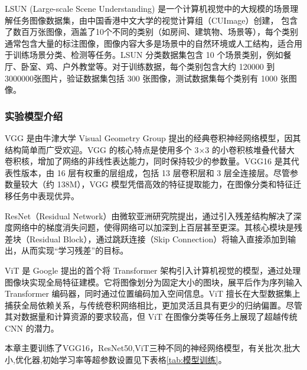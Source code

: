 LSUN (Large-scale Scene Understanding) 是一个计算机视觉中的大规模的场景理解任务图像数据集，由中国香港中文大学的视觉计算组（CUImage）创建， 包含了数百万张图像，涵盖了10个不同的类别（如房间、建筑物、场景等），每个类别通常包含大量的标注图像，图像内容大多是场景中的自然环境或人工结构，适合用于训练场景分类、检测等任务。LSUN 分类数据集包含 10 个场景类别，例如餐厅、卧室、鸡、户外教堂等。对于训练数据，每个类别包含大约 120000 到 3000000张图片，验证数据集包括 300 张图像，测试数据集每个类别有 1000 张图像。


\subsubsection{实验模型介绍}
VGG 是由牛津大学 Visual Geometry Group 提出的经典卷积神经网络模型，因其结构简单而广受欢迎。VGG 的核心特点是使用多个 3×3 的小卷积核堆叠代替大卷积核，增加了网络的非线性表达能力，同时保持较少的参数量。VGG16 是其代表性版本，由 16 层有权重的层组成，包括 13 层卷积层和 3 层全连接层。尽管参数量较大（约 138M），VGG 模型凭借高效的特征提取能力，在图像分类和特征迁移任务中表现优异。

ResNet（Residual Network）由微软亚洲研究院提出，通过引入残差结构解决了深度网络中的梯度消失问题，使得网络可以加深到上百层甚至更深。其核心模块是残差块（Residual Block），通过跳跃连接（Skip Connection）将输入直接添加到输出，从而实现“学习残差”的目标。

ViT 是 Google 提出的首个将 Transformer 架构引入计算机视觉的模型，通过处理图像块实现全局特征建模。它将图像划分为固定大小的图块，展平后作为序列输入 Transformer 编码器，同时通过位置编码加入空间信息。ViT 擅长在大型数据集上捕获全局依赖关系，与传统卷积网络相比，更加灵活且具有更少的归纳偏置。尽管其对数据量和计算资源的要求较高，但 ViT 在图像分类等任务上展现了超越传统 CNN 的潜力。

本章主要训练了VGG16，ResNet50,ViT三种不同的神经网络模型，有关批次,批大小,优化器,初始学习率等超参数设置见下表格\ref{tab:模型训练}。
\begin{table}[htbp]
	\captionsetup{font=small, justification=centering}
	\centering
	\caption{
	模型训练超参数设置
	}
        \label{tab:模型训练}
\end{table}



